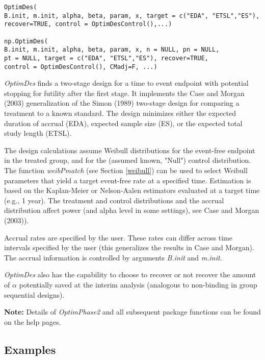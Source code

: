\documentclass[12pt]{article}
\begin{document}
\begin{center}
\begin{verbatim}
OptimDes(
B.init, m.init, alpha, beta, param, x, target = c("EDA", "ETSL","ES"),
recover=TRUE, control = OptimDesControl(),...)

np.OptimDes(
B.init, m.init, alpha, beta, param, x, n = NULL, pn = NULL,
pt = NULL, target = c("EDA", "ETSL","ES"), recover=TRUE,
control = OptimDesControl(), CMadj=F, ...)
\end{verbatim}
\end{center}

{\it OptimDes} finds a two-stage design for a time to event endpoint with potential stopping for
futility after the first stage. It implements the Case and Morgan (2003) generalization of the
Simon (1989) two-stage design for comparing a treatment to a known standard. The design minimizes
either the expected duration of accrual (EDA), expected sample size (ES), or the expected total
study length (ETSL).

The design calculations assume Weibull distributions for the event-free endpoint in the treated
group, and for the (assumed known, "Null") control distribution. The function {\it weibPmatch} (see
Section \ref{weibull}) can be used to select Weibull parameters that yield a target event-free rate
at a specified time. Estimation is based on the Kaplan-Meier or Nelson-Aalen estimators evaluated
at a target time (e.g., 1 year). The treatment and control distributions and the accrual
distribution affect power (and alpha level in some settings), see Case and Morgan (2003)).

Accrual rates are specified by the user. These rates can differ across time intervals specified by the user (this
generalizes the results in Case and Morgan). The accrual information is controlled by arguments {\it B.init} and
{\it m.init}.

{\it OptimDes} also has the capability to choose to recover or not recover the amount of $\alpha$ potentially saved
at the interim analysis (analogous to non-binding in group sequential designs).

{\bf Note:} Details of {\it OptimPhase2} and all subsequent package functions can be found on the help pages.

\subsection{Examples}
\label{optexample}
\end{document}
